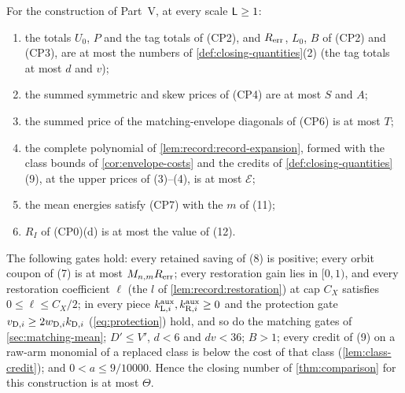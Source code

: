 \begin{proposition}
\label{prop:closing-data}
For the construction of Part~V, at every scale $\mathsf L\ge1$:
\begin{enumerate}[label=(\alph*)]
\item the totals $U_0$, $P$ and the tag totals of (CP2), and $R_{\rm err}$,
 $L_0$, $B$ of (CP2) and (CP3), are at most the numbers of
 \cref{def:closing-quantities}(2) (the tag totals at most $d$ and $v$);
\item the summed symmetric and skew prices of (CP4) are at most $S$ and $A$;
\item the summed price of the matching-envelope diagonals of (CP6) is at
 most $T$;
\item the complete polynomial of \cref{lem:record:record-expansion}, formed
 with the class bounds of \cref{cor:envelope-costs} and the credits of
 \cref{def:closing-quantities}(9), at the upper prices of (3)--(4), is at most
 $\mathcal E$;
\item the mean energies satisfy (CP7) with the $m$ of (11);
\item $R_I$ of (CP0)(d) is at most the value of (12).
\end{enumerate}
The following gates hold: every retained saving of (8) is positive; every
orbit coupon of (7) is at most $M_{n,m}R_{\rm err}$; every restoration gain lies
in $[0,1)$, and every restoration coefficient $\ell$ (the $l$ of \cref{lem:record:restoration}) at cap $C_X$ satisfies $0\le\ell\le C_X/2$; in
every piece $k^{\rm aux}_{{\rm L},i},k^{\rm aux}_{{\rm R},i}\ge0$ and the
protection gate $v_{{\rm D},i}\ge2w_{{\rm D},i}k_{{\rm D},i}$ (\eqref{eq:protection})
hold, and so do the matching gates of \cref{sec:matching-mean}; $D'\le V'$,
$d<6$ and $dv<36$; $B>1$; every credit of (9) on a raw-arm
monomial of a replaced class is below the cost of that class
(\cref{lem:class-credit}); and $0<a\le9/10000$. Hence the closing number of
\cref{thm:comparison} for this construction is at most $\Theta$.
\end{proposition}

